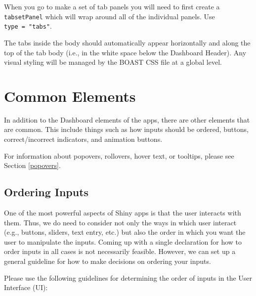 \documentclass[
]{book}
\begin{document}
When you go to make a set of tab panels you will need to first create a \texttt{tabsetPanel} which will wrap around all of the individual panels. Use \texttt{type\ =\ "tabs"}.

The tabs inside the body should automatically appear horizontally and along the top of the tab body (i.e., in the white space below the Dashboard Header). Any visual styling will be managed by the BOAST CSS file at a global level.

\hypertarget{common-elements}{%
\section{Common Elements}\label{common-elements}}

In addition to the Dashboard elements of the apps, there are other elements that are common. This include things such as how inputs should be ordered, buttons, correct/incorrect indicators, and animation buttons.

For information about popovers, rollovers, hover text, or tooltips, please see Section \ref{popovers}.

\hypertarget{ordering-inputs}{%
\subsection{Ordering Inputs}\label{ordering-inputs}}

One of the most powerful aspects of Shiny apps is that the user interacts with them. Thus, we do need to consider not only the ways in which user interact (e.g., buttons, sliders, text entry, etc.) but also the order in which you want the user to manipulate the inputs. Coming up with a single declaration for how to order inputs in all cases is not necessarily feasible. However, we can set up a general guideline for how to make decisions on ordering your inputs.

Please use the following guidelines for determining the order of inputs in the User Interface (UI):
\end{document}
